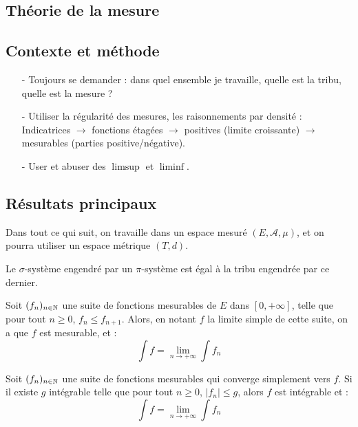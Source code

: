 \documentclass[11pt,a4paper]{article}
\begin{document}
\newpage
\begin{center}
\section*{Théorie de la mesure} 
\end{center}

\subsection*{Contexte et méthode}

\begin{itemize}
\item[-] Toujours se demander : dans quel ensemble je travaille, quelle est la tribu, quelle est la mesure ? 
\item[-] Utiliser la régularité des mesures, les raisonnements par densité : \\
 Indicatrices $\rightarrow$ fonctions étagées $\rightarrow$ positives (limite croissante) $\rightarrow$ mesurables (parties positive/négative). 
\item[-] User et abuser des $\limsup$ et $\liminf$.
\end{itemize}

\subsection*{Résultats principaux}
Dans tout ce qui suit, on travaille dans un espace mesuré $(E,\mathcal{A},\mu)$, et on pourra utiliser un espace métrique $(T,d)$.


\begin{thmstar}[Dynkin] 
Le $\sigma$-système engendré par un $\pi$-système est égal à la tribu engendrée par ce dernier.
\end{thmstar}


\begin{thmstar}
Soit $(f_n)_{n\in\mathbb N}$ une suite de fonctions mesurables de $E$ dans $[0,+\infty]$, telle que pour tout $n\geq 0$, $f_n \leq f_{n+1}  $. Alors, en notant $f$ la limite simple de cette suite, on a que $f$ est mesurable, et : 
\[\int f = \lim\limits_{n \to +\infty} \int f_n \]
\end{thmstar}


\begin{thmstar}
Soit $(f_n)_{n\in\mathbb N}$ une suite de fonctions mesurables qui converge simplement vers $f$. Si il existe $g$ intégrable telle que pour tout $n \geq 0$, $\left| f_n \right| \leq g$, alors $f$ est intégrable et :
\[\int f = \lim\limits_{n \to +\infty} \int f_n \]
\end{thmstar}
\end{document}
